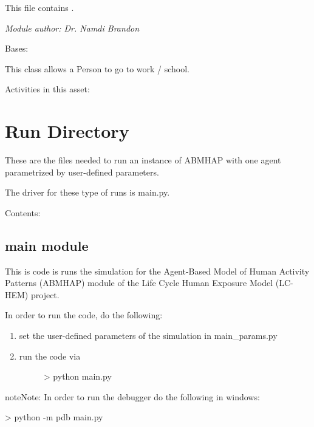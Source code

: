 \documentclass[letterpaper,10pt,english]{sphinxmanual}
\begin{document}
This file contains {\hyperref[workplace:workplace.Workplace]{\emph{}}}.

\emph{Module author: Dr. Namdi Brandon}

\begin{fulllineitems}
\label{workplace:workplace.Workplace}
Bases: {\hyperref[asset:asset.Asset]{\emph{}}}

This class allows a Person to go to work / school.

Activities in this asset: {\hyperref[work:work.Work]{\emph{}}}

\end{fulllineitems}



\chapter{Run Directory}
\label{index:run-directory}
These are the files needed to run an instance of ABMHAP with one agent parametrized by user-defined parameters.

The driver for these type of runs is main.py.

Contents:


\section{main module}
\label{main::doc}\label{main:main-module}\label{main:module-main}
This is code is runs the simulation for the Agent-Based Model of Human Activity Patterns (ABMHAP) module of the Life Cycle Human Exposure Model (LC-HEM) project.

In order to run the code, do the following:
\begin{enumerate}
\item {} 
set the user-defined parameters of the simulation in main\_params.py

\item {} \begin{description}
\item[{run the code via}] \leavevmode
\textgreater{} python main.py

\end{description}

\end{enumerate}

\begin{notice}{note}{Note:}
In order to run the debugger do the following in windows:

\textgreater{} python -m pdb main.py
\end{notice}
\end{document}
